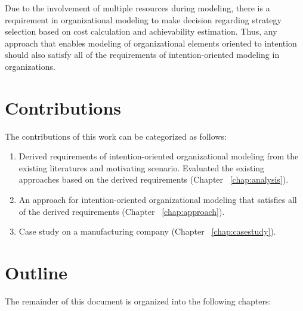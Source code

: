 Due to the involvement of multiple resources during modeling, there is a requirement in organizational modeling to make decision regarding strategy selection based on cost calculation and achievability estimation. Thus, any approach that enables modeling of organizational elements oriented to intention should also satisfy all of the requirements of intention-oriented modeling in organizations. 

\section {Contributions}
\label{sec:researchobjectives}
The contributions of this work can be categorized as follows:

\begin{enumerate}
 	\item Derived requirements of intention-oriented organizational modeling from the existing literatures and motivating scenario. Evaluated the existing approaches based on the derived requirements (Chapter  ~\ref{chap:analysis}).
 	\item An approach for intention-oriented organizational modeling that satisfies all of the derived requirements (Chapter ~\ref{chap:approach}).
 	\item Case study on a manufacturing company (Chapter ~\ref{chap:casestudy}).
\end{enumerate}
 
\section{Outline}
\label{sec:outline}
The remainder of this document is organized into the following chapters:

